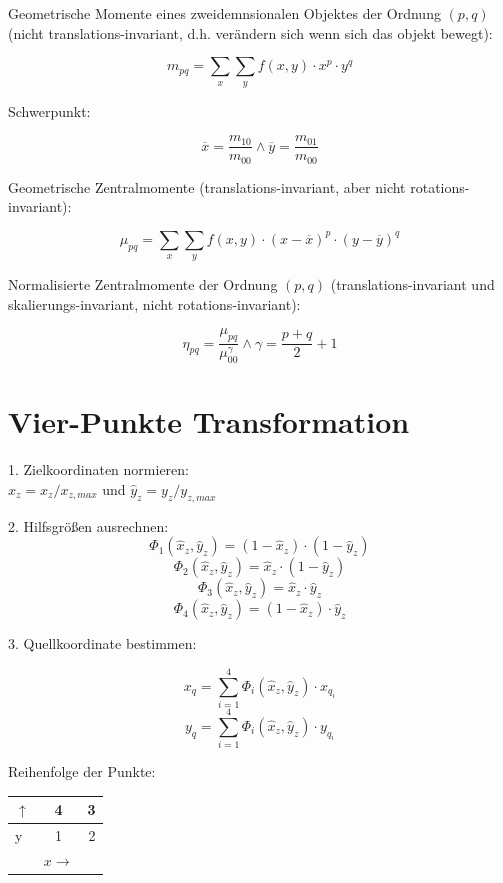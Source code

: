 Geometrische Momente eines zweidemnsionalen Objektes der Ordnung $(p,q)$ (nicht translations-invariant, d.h. verändern sich wenn sich das objekt
bewegt):

\[ m_{pq} = \sum_x \sum_y f(x,y) \cdot x^p \cdot y^q \]

Schwerpunkt:

\[ \overline{x} = \frac{m_{10}}{m_{00}} \wedge \overline{y} = \frac{m_{01}}{m_{00}} \]


Geometrische Zentralmomente (translations-invariant, aber nicht rotations-invariant):

\[ \mu_{pq} = \sum_x \sum_y f(x,y) \cdot (x-\overline{x})^p \cdot (y - \overline{y})^q \]


Normalisierte Zentralmomente der Ordnung $(p,q)$ (translations-invariant und skalierungs-invariant, nicht rotations-invariant):

\[ \eta_{pq} = \frac{\mu_{pq}}{\mu_{00}^\gamma} \wedge \gamma = \frac{p+q}{2} + 1 \]






\section{Vier-Punkte Transformation}

1. Zielkoordinaten normieren: \\
$\hat{x}_z = x_z / x_{z,max}$ und $\hat{y}_z = y_z / y_{z,max}$

2. Hilfsgrößen ausrechnen: \\
\[ \Phi_1(\hat{x}_z, \hat{y}_z) = (1-\hat{x}_z) \cdot (1-\hat{y}_z) \]
\[ \Phi_2(\hat{x}_z, \hat{y}_z) = \hat{x}_z \cdot (1-\hat{y}_z) \]
\[ \Phi_3(\hat{x}_z, \hat{y}_z) = \hat{x}_z \cdot \hat{y}_z \]
\[ \Phi_4(\hat{x}_z, \hat{y}_z) = (1-\hat{x}_z) \cdot \hat{y}_z \]

3. Quellkoordinate bestimmen:

\[ x_q = \sum_{i=1}^4 \Phi_i (\hat{x}_z, \hat{y}_z) \cdot x_{q_i} \]
\[ y_q = \sum_{i=1}^4 \Phi_i (\hat{x}_z, \hat{y}_z) \cdot y_{q_i} \]

Reihenfolge der Punkte:

\begin{tabular}{  l || c | r | }
	\hline
	$\uparrow$ & 4 & 3 \\
	\hline
	y & 1 & 2 \\
	\hline
	 & $x \rightarrow$ &  \\
\end{tabular}




